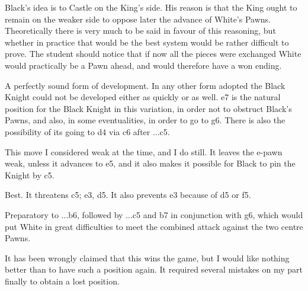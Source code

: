 \documentclass[10pt,twoside]{article}
\begin{document}

Black's idea is to Castle on the King's side. His reason is that the King ought to remain on the weaker side to oppose later the advance of White's Pawns. Theoretically there is very much to be said in favour of this reasoning, but whether in practice that would be the best system would be rather difficult to prove. The student should notice that if now all the pieces were exchanged White would practically be a Pawn ahead, and would therefore have a won ending.


A perfectly sound form of development. In any other form adopted the Black Knight could not be developed either as quickly or as well. e7 is the natural position for the Black Knight in this variation, in order not to obstruct Black's Pawns, and also, in some eventualities, in order to go to g6. There is also the possibility of its going to d4 via c6 after ...c5.


This move I considered weak at the time, and I do still. It leaves the e-pawn weak, unless it advances to e5, and it also makes it possible for Black to pin the Knight by \figB c5.


Best. It threatens \figB c5; \figB e3, \figN d5. It also prevents \figB e3 because of \figN d5 or f5.


Preparatory to ...b6, followed by ...c5 and \figB b7 in conjunction with \figN g6, which would put White in great difficulties to meet the combined attack against the two centre Pawns.


\board

It has been wrongly claimed that this wins the game, but I would like nothing better than to have such a position again. It required several mistakes on my part finally to obtain a lost position.


\board

\end{document}
